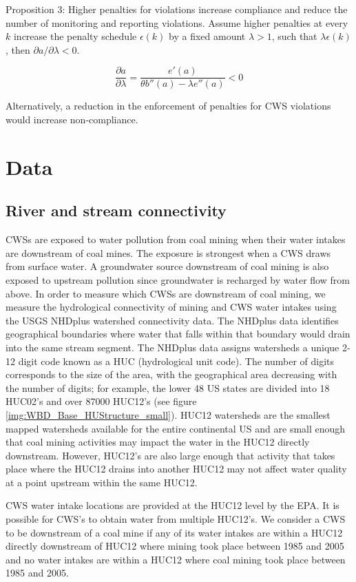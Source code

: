 \documentclass{article}
\begin{document}
Proposition 3: Higher penalties for violations increase compliance and reduce the number of monitoring and reporting violations. Assume higher penalties at every $k$ increase the penalty schedule $\epsilon(k)$ by a fixed amount $\lambda>1$, such that $\lambda\epsilon(k)$, then $\partial a/\partial \lambda<0$.

\[\frac{\partial a}{\partial \lambda}=\frac{e'(a)}{\theta b''(a)-\lambda e''(a)}<0\]

Alternatively, a reduction in the enforcement of penalties for CWS violations would increase non-compliance.

\section{Data}

\subsection{River and stream connectivity}

CWSs are exposed to water pollution from coal mining when their water intakes are downstream of coal mines. The exposure is strongest when a CWS draws from surface water. A groundwater source downstream of coal mining is also exposed to upstream pollution since groundwater is recharged by water flow from above. In order to measure which CWSs are downstream of coal mining, we measure the hydrological connectivity of mining and CWS water intakes using the USGS NHDplus watershed connectivity data. The NHDplus data identifies geographical boundaries where water that falls within that boundary would drain into the same stream segment. The NHDplus data assigns watersheds a unique 2-12 digit code known as a HUC (hydrological unit code). The number of digits corresponds to the size of the area, with the geographical area decreasing with the number of digits; for example, the lower 48 US states are divided into 18 HUC02's and over 87000 HUC12's (see figure \ref{img:WBD_Base_HUStructure_small}). HUC12 watersheds are the smallest mapped watersheds available for the entire continental US and are small enough that coal mining activities may impact the water in the HUC12 directly downstream. However, HUC12's are also large enough that activity that takes place where the HUC12 drains into another HUC12 may not affect water quality at a point upstream within the same HUC12. 

CWS water intake locations are provided at the HUC12 level by the EPA. It is possible for CWS's to obtain water from multiple HUC12's. We consider a CWS to be downstream of a coal mine if any of its water intakes are within a HUC12 directly downstream of HUC12 where mining took place between 1985 and 2005 and no water intakes are within a HUC12 where coal mining took place between 1985 and 2005.
\end{document}
